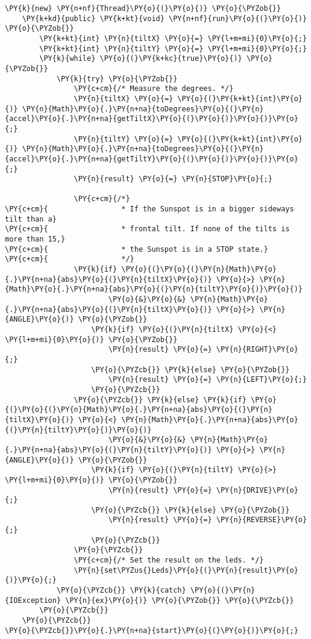 \begin{Verbatim}[commandchars=\\\{\}]
\PY{k}{new} \PY{n+nf}{Thread}\PY{o}{(}\PY{o}{)} \PY{o}{\PYZob{}}
    \PY{k+kd}{public} \PY{k+kt}{void} \PY{n+nf}{run}\PY{o}{(}\PY{o}{)} \PY{o}{\PYZob{}}
        \PY{k+kt}{int} \PY{n}{tiltX} \PY{o}{=} \PY{l+m+mi}{0}\PY{o}{;}
        \PY{k+kt}{int} \PY{n}{tiltY} \PY{o}{=} \PY{l+m+mi}{0}\PY{o}{;}
        \PY{k}{while} \PY{o}{(}\PY{k+kc}{true}\PY{o}{)} \PY{o}{\PYZob{}}
            \PY{k}{try} \PY{o}{\PYZob{}}
                \PY{c+cm}{/* Measure the degrees. */}
                \PY{n}{tiltX} \PY{o}{=} \PY{o}{(}\PY{k+kt}{int}\PY{o}{)} \PY{n}{Math}\PY{o}{.}\PY{n+na}{toDegrees}\PY{o}{(}\PY{n}{accel}\PY{o}{.}\PY{n+na}{getTiltX}\PY{o}{(}\PY{o}{)}\PY{o}{)}\PY{o}{;}
                \PY{n}{tiltY} \PY{o}{=} \PY{o}{(}\PY{k+kt}{int}\PY{o}{)} \PY{n}{Math}\PY{o}{.}\PY{n+na}{toDegrees}\PY{o}{(}\PY{n}{accel}\PY{o}{.}\PY{n+na}{getTiltY}\PY{o}{(}\PY{o}{)}\PY{o}{)}\PY{o}{;}
                \PY{n}{result} \PY{o}{=} \PY{n}{STOP}\PY{o}{;}

                \PY{c+cm}{/*}
\PY{c+cm}{                 * If the Sunspot is in a bigger sideways tilt than a}
\PY{c+cm}{                 * frontal tilt. If none of the tilts is more than 15,}
\PY{c+cm}{                 * the Sunspot is in a STOP state.}
\PY{c+cm}{                 */}
                \PY{k}{if} \PY{o}{(}\PY{o}{(}\PY{n}{Math}\PY{o}{.}\PY{n+na}{abs}\PY{o}{(}\PY{n}{tiltX}\PY{o}{)} \PY{o}{>} \PY{n}{Math}\PY{o}{.}\PY{n+na}{abs}\PY{o}{(}\PY{n}{tiltY}\PY{o}{)}\PY{o}{)}
                        \PY{o}{&}\PY{o}{&} \PY{n}{Math}\PY{o}{.}\PY{n+na}{abs}\PY{o}{(}\PY{n}{tiltX}\PY{o}{)} \PY{o}{>} \PY{n}{ANGLE}\PY{o}{)} \PY{o}{\PYZob{}}
                    \PY{k}{if} \PY{o}{(}\PY{n}{tiltX} \PY{o}{<} \PY{l+m+mi}{0}\PY{o}{)} \PY{o}{\PYZob{}}
                        \PY{n}{result} \PY{o}{=} \PY{n}{RIGHT}\PY{o}{;}
                    \PY{o}{\PYZcb{}} \PY{k}{else} \PY{o}{\PYZob{}}
                        \PY{n}{result} \PY{o}{=} \PY{n}{LEFT}\PY{o}{;}
                    \PY{o}{\PYZcb{}}
                \PY{o}{\PYZcb{}} \PY{k}{else} \PY{k}{if} \PY{o}{(}\PY{o}{(}\PY{n}{Math}\PY{o}{.}\PY{n+na}{abs}\PY{o}{(}\PY{n}{tiltX}\PY{o}{)} \PY{o}{<} \PY{n}{Math}\PY{o}{.}\PY{n+na}{abs}\PY{o}{(}\PY{n}{tiltY}\PY{o}{)}\PY{o}{)}
                        \PY{o}{&}\PY{o}{&} \PY{n}{Math}\PY{o}{.}\PY{n+na}{abs}\PY{o}{(}\PY{n}{tiltY}\PY{o}{)} \PY{o}{>} \PY{n}{ANGLE}\PY{o}{)} \PY{o}{\PYZob{}}
                    \PY{k}{if} \PY{o}{(}\PY{n}{tiltY} \PY{o}{>} \PY{l+m+mi}{0}\PY{o}{)} \PY{o}{\PYZob{}}
                        \PY{n}{result} \PY{o}{=} \PY{n}{DRIVE}\PY{o}{;}
                    \PY{o}{\PYZcb{}} \PY{k}{else} \PY{o}{\PYZob{}}
                        \PY{n}{result} \PY{o}{=} \PY{n}{REVERSE}\PY{o}{;}
                    \PY{o}{\PYZcb{}}
                \PY{o}{\PYZcb{}}
                \PY{c+cm}{/* Set the result on the leds. */}
                \PY{n}{set\PYZus{}Leds}\PY{o}{(}\PY{n}{result}\PY{o}{)}\PY{o}{;}
            \PY{o}{\PYZcb{}} \PY{k}{catch} \PY{o}{(}\PY{n}{IOException} \PY{n}{ex}\PY{o}{)} \PY{o}{\PYZob{}} \PY{o}{\PYZcb{}}
        \PY{o}{\PYZcb{}}
    \PY{o}{\PYZcb{}}
\PY{o}{\PYZcb{}}\PY{o}{.}\PY{n+na}{start}\PY{o}{(}\PY{o}{)}\PY{o}{;}
\end{Verbatim}
